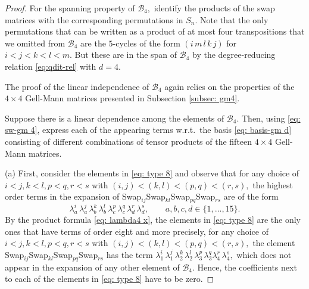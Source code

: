 \documentclass[10pt,a4paper]{amsart}
\begin{document}
\begin{proof}
	For the spanning property of $\mathcal{B}_4,$ identify the products of the swap matrices with the corresponding permutations in $S_n.$ Note that the only permutations that can be written as a product of at most four transpositions that we omitted from $\mathcal{B}_4$ are the $5$-cycles of the form $(i\,m\,l\,k\,j)$ for $i<j<k<l<m.$ But these are in the span of $\mathcal{B}_4$ by the degree-reducing relation \eqref{eq:qdit-rel} with $d=4.$
	
	
	The proof of the linear independence of $\mathcal{B}_4$ again relies on the properties of the $4\times 4$ Gell-Mann matrices presented in Subsection \ref{subsec: gm4}.
	
	Suppose there is a linear dependence among the elements of $\mathcal{B}_4.$ 
	Then, using \eqref{eq: sw-gm 4}, express each of the appearing terms w.r.t.~the basis \eqref{eq: basis-gm d} consisting of different combinations of tensor products of the fifteen $4 \times 4$ Gell-Mann matrices.
	
	(a) First, consider the elements in \eqref{eq: type 8} and observe that for any choice of $i < j, k < l,  p < q, r < s$ with  $(i,j) < (k,l) < (p,q)<(r,s),$ the highest order terms in the expansion of Swap$_{ij}$Swap$_{kl}$Swap$_{pq}$Swap$_{rs}$ are of the form
	$$
	\lambda_a^i\, \lambda_a^j\, \lambda_b^k\, \lambda_b^l\, \lambda_c^p\, \lambda_c^q \, \lambda_d^r\, \lambda_d^s, \quad \quad a,b,c,d \in \{1,\ldots,15\}.
	$$
	By the product formula \eqref{eq: lambda4 x}, the elements in \eqref{eq: type 8} are the only ones that have terms of order eight and more precisely, for any choice of $i < j, k < l,  p < q, r < s$ with  $(i,j) < (k,l) < (p,q)<(r,s),$ the element Swap$_{ij}$Swap$_{kl}$Swap$_{pq}$Swap$_{rs}$  has the term $\lambda_1^i\, \lambda_1^j\, \lambda_2^k\, \lambda_2^l\, \lambda_3^p\, \lambda_3^q\lambda_4^r\, \lambda_4^s,$
	which does not appear in the expansion of any other element of $\mathcal{B}_4.$ Hence, the coefficients next to each of the elements in \eqref{eq: type 8} have to be zero. 
	

\end{proof}
\end{document}

